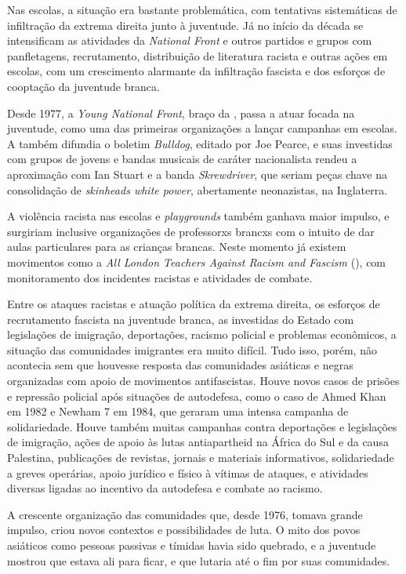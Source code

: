 Nas escolas, a situação era bastante problemática, com tentativas sistemáticas de infiltração da extrema direita junto à juventude. Já no início da década se intensificam as atividades da \emph{National Front} e outros partidos e grupos com panfletagens, recrutamento, distribuição de literatura racista e outras ações em escolas, com um crescimento alarmante da infiltração fascista e dos esforços de cooptação da juventude branca.

Desde 1977, a \emph{Young National Front}, braço da , passa a atuar focada na juventude, como uma das primeiras organizações a lançar campanhas em escolas. A  também difundia o boletim \emph{Bulldog}, editado por Joe Pearce, e suas investidas com grupos de jovens e bandas musicais de caráter nacionalista rendeu a aproximação com Ian Stuart e a banda \emph{Skrewdriver}, que seriam peças chave na consolidação de \emph{skinheads white power}, abertamente neonazistas, na Inglaterra.

A violência racista nas escolas e \emph{playgrounds} também ganhava maior impulso, e surgiriam inclusive organizações de professorxs brancxs com o intuito de dar aulas particulares para as crianças brancas. Neste momento já existem movimentos como a \emph{All London Teachers Against Racism and Fascism} (), com monitoramento dos incidentes racistas e atividades de combate.

Entre os ataques racistas e atuação política da extrema direita, os esforços de recrutamento fascista na juventude branca, as investidas do Estado com legislações de imigração, deportações, racismo policial e problemas econômicos, a situação das comunidades imigrantes era muito difícil. Tudo isso, porém, não acontecia sem que houvesse resposta das comunidades asiáticas e negras organizadas com apoio de movimentos antifascistas. Houve novos casos de prisões e repressão policial após situações de autodefesa, como o caso de Ahmed Khan em 1982 e Newham 7 em 1984, que geraram uma intensa campanha de solidariedade. Houve também muitas campanhas contra deportações e legislações de imigração, ações de apoio às lutas antiapartheid na África do Sul e da causa Palestina, publicações de revistas, jornais e materiais informativos, solidariedade a greves operárias, apoio jurídico e físico à vítimas de ataques, e atividades diversas ligadas ao incentivo da autodefesa e combate ao racismo.

 


A crescente organização das comunidades que, desde 1976, tomava grande impulso, criou novos contextos e possibilidades de luta. O mito dos povos asiáticos como pessoas passivas e tímidas havia sido quebrado, e a juventude mostrou que estava ali para ficar, e que lutaria até o fim por suas comunidades.

